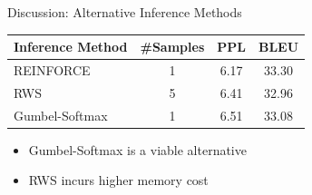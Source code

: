 
\begin{frame}{Discussion: Alternative Inference Methods}
\begin{table}
\centering
\begin{tabular}{lccc}
       \toprule
    Inference Method & \#Samples & PPL & BLEU \\
    \midrule
  REINFORCE & 1 & 6.17 & 33.30 \\
  RWS & 5 & 6.41 & 32.96 \\
  Gumbel-Softmax  & 1 & 6.51 & 33.08\\
    \bottomrule
   \end{tabular}
   \end{table}
\begin{itemize}
    \item Gumbel-Softmax is a viable alternative
    \item RWS incurs higher memory cost
\end{itemize}


\end{frame}
